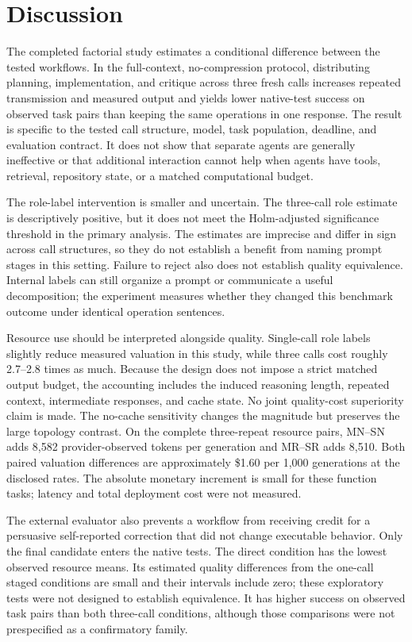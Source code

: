 \documentclass[10pt,letterpaper]{article}
\begin{document}
\section*{Discussion}
The completed factorial study estimates a conditional difference between the tested workflows. In the full-context, no-compression protocol, distributing planning, implementation, and critique across three fresh calls increases repeated transmission and measured output and yields lower native-test success on observed task pairs than keeping the same operations in one response. The result is specific to the tested call structure, model, task population, deadline, and evaluation contract. It does not show that separate agents are generally ineffective or that additional interaction cannot help when agents have tools, retrieval, repository state, or a matched computational budget.

The role-label intervention is smaller and uncertain. The three-call role estimate is descriptively positive, but it does not meet the Holm-adjusted significance threshold in the primary analysis. The estimates are imprecise and differ in sign across call structures, so they do not establish a benefit from naming prompt stages in this setting. Failure to reject also does not establish quality equivalence. Internal labels can still organize a prompt or communicate a useful decomposition; the experiment measures whether they changed this benchmark outcome under identical operation sentences.

Resource use should be interpreted alongside quality. Single-call role labels slightly reduce measured valuation in this study, while three calls cost roughly 2.7--2.8 times as much. Because the design does not impose a strict matched output budget, the accounting includes the induced reasoning length, repeated context, intermediate responses, and cache state. No joint quality-cost superiority claim is made. The no-cache sensitivity changes the magnitude but preserves the large topology contrast. On the complete three-repeat resource pairs, MN--SN adds 8,582 provider-observed tokens per generation and MR--SR adds 8,510. Both paired valuation differences are approximately \$1.60 per 1,000 generations at the disclosed rates. The absolute monetary increment is small for these function tasks; latency and total deployment cost were not measured.

The external evaluator also prevents a workflow from receiving credit for a persuasive self-reported correction that did not change executable behavior. Only the final candidate enters the native tests. The direct condition has the lowest observed resource means. Its estimated quality differences from the one-call staged conditions are small and their intervals include zero; these exploratory tests were not designed to establish equivalence. It has higher success on observed task pairs than both three-call conditions, although those comparisons were not prespecified as a confirmatory family.
\end{document}
